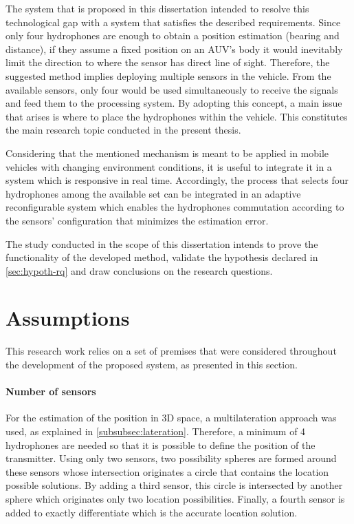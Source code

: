 The system that is proposed in this dissertation intended to resolve this technological gap with a system that satisfies the described requirements. Since only four hydrophones are enough to obtain a position estimation (bearing and distance), if they assume a fixed position on an AUV's body it would inevitably limit the direction to where the sensor has direct line of sight. Therefore, the suggested method implies deploying multiple sensors in the vehicle. From the available sensors, only four would be used simultaneously to receive the signals and feed them to the processing system. By adopting this concept, a main issue that arises is where to place the hydrophones within the vehicle. This constitutes the main research topic conducted in the present thesis.

Considering that the mentioned mechanism is meant to be applied in mobile vehicles with changing environment conditions, it is useful to integrate it in a system which is responsive in real time. Accordingly, the process that selects four hydrophones among the available set can be integrated in an adaptive reconfigurable system which enables the hydrophones commutation according to the sensors' configuration that minimizes the estimation error.

The study conducted in the scope of this dissertation intends to prove the functionality of the developed method, validate the hypothesis declared in \ref{sec:hypoth-rq} and draw conclusions on the research questions.

\section{Assumptions} \label{sec:premises}

This research work relies on a set of premises that were considered throughout the development of the proposed system, as presented in this section.

\paragraph{Number of sensors} For the estimation of the position in 3D space, a multilateration approach was used, as explained in \ref{subsubsec:lateration}. Therefore, a minimum of 4 hydrophones are needed so that it is possible to define the position of the transmitter. Using only two sensors, two possibility spheres are formed around these sensors whose intersection originates a circle that contains the location possible solutions. By adding a third sensor, this circle is intersected by another sphere which originates only two location possibilities. Finally, a fourth sensor is added to exactly differentiate which is the accurate location solution.

